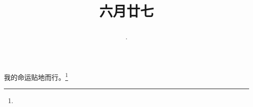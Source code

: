 \title{\date[d=1,m=8,y=2024][year:cn-y,年,month:cn,day:cn,日,·,weekday]·六月廿七 }
我的命运贴地而行。\footnote{ }

